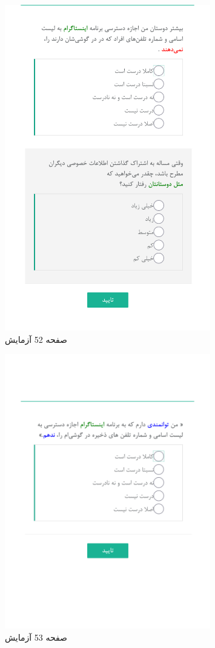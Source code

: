 \begin{figure}[htpb]
    \centering
    \includegraphics[width=0.8\textwidth]{./img/Task52.png}
    \caption{ صفحه 52 آزمایش }
    \label{fig:Task52}
\end{figure}


\begin{figure}[htpb]
    \centering
    \includegraphics[width=0.8\textwidth]{./img/Task53.png}
    \caption{ صفحه 53 آزمایش }
    \label{fig:Task53}
\end{figure}



